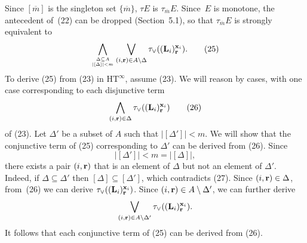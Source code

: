 \documentclass{tlp}
\def\o{\overline}
\def\beq{\begin{equation}}
\def\eeq#1{\label{#1}\end{equation}}
\begin{document}
\begin{proof*}
Since $[\o m]$ is the singleton set $\{\o m\}$,
$\tau E$ is $\tau_{\o m} E$.
Since~$E$ is monotone,
the antecedent of~(22) can be dropped
(Section~5.1), so that $\tau_{\o m} E$ is strongly equivalent to
\[
  \bigwedge_{ \Delta \subseteq A \atop \lvert [\Delta] \rvert < m}
  \bigvee_{(i,{\bf r}) \in A\setminus\Delta}
  \tau_{\lor}(({\bf L}_i)^{{\bf x}_i}_{\bf r}).
\tag{25}
\label{mono_geq}
\]
To derive (25) from (23) in HT\/$^\infty$,
assume (23). We will reason by cases, with one case
corresponding to each disjunctive term
\[
  \bigwedge_{(i,{\bf r}) \in \Delta}
  \tau_{\lor}(({\bf L}_i)^{{\bf x}_i}_{\bf r})
\tag{26}
\label{dterm}
\]
of (23).
Let $\Delta'$ be a subset of $A$ such that
$\lvert [\Delta']\rvert < m$.
We will show that the conjunctive term
of (25) corresponding to $\Delta'$ can be derived from
(26).  Since
\[
\lvert [\Delta'] \rvert < m = \lvert [\Delta]\rvert,
\tag{27}
\label{ineq}
\]
there exists a pair $(i, {\bf r})$ that is an element of $\Delta$ but
not an element of $\Delta'$. Indeed, if \hbox{$\Delta \subseteq \Delta'$} then
$[\Delta] \subseteq [\Delta']$, which contradicts (27).
Since $(i, {\bf r}) \in \Delta$, from~(26)
we can derive $\tau_{\lor}(({\bf L}_i)_{\bf r}^{{\bf x}_i})$. Since
$(i, {\bf r}) \in A \setminus \Delta'$, we can further derive
$$
 \bigvee_{(i,{\bf r}) \in A\setminus\Delta'}
 \tau_{\lor}(({\bf L}_i)^{{\bf x}_i}_{\bf r}).
$$
It follows that each conjunctive term of (25)
can be derived from (26).


\end{proof*}
\end{document}
